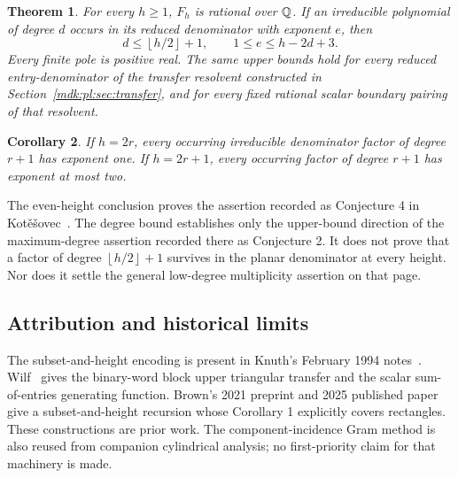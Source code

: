 \documentclass[11pt,letterpaper]{article}
\numberwithin{equation}{section}
\newtheorem{theorem}{Theorem}[section]
\newtheorem{corollary}[theorem]{Corollary}
\theoremstyle{remark}\newtheorem{remark}[theorem]{Remark}
\newcommand{\floor}[1]{\left\lfloor #1\right\rfloor}
\begin{document}
\begin{theorem}\label{mdk:pl:thm:main}
For every $h\ge1$, $F_h$ is rational over $\mathbb Q$. If an irreducible polynomial of degree $d$ occurs in its reduced denominator with exponent $e$, then
\begin{equation}\label{mdk:pl:eq:main}
 d\le\floor{h/2}+1,\qquad 1\le e\le h-2d+3.
\end{equation}
Every finite pole is positive real. The same upper bounds hold for every reduced entry-denominator of the transfer resolvent constructed in Section~\ref{mdk:pl:sec:transfer}, and for every fixed rational scalar boundary pairing of that resolvent.
\end{theorem}

\begin{corollary}\label{mdk:pl:cor:parity}
If $h=2r$, every occurring irreducible denominator factor of degree $r+1$ has exponent one. If $h=2r+1$, every occurring factor of degree $r+1$ has exponent at most two.
\end{corollary}

The even-height conclusion proves the assertion recorded as Conjecture 4 in Kot\v e\v sovec~\cite[p.~83]{kotesovec}. The degree bound establishes only the upper-bound direction of the maximum-degree assertion recorded there as Conjecture 2. It does not prove that a factor of degree $\floor{h/2}+1$ survives in the planar denominator at every height. Nor does it settle the general low-degree multiplicity assertion on that page.

\subsection{Attribution and historical limits}
The subset-and-height encoding is present in Knuth's February 1994 notes~\cite{knuth}. Wilf~\cite[Lemmas 2--3]{wilf} gives the binary-word block upper triangular transfer and the scalar sum-of-entries generating function. Brown's 2021 preprint and 2025 published paper~\cite{brown} give a subset-and-height recursion whose Corollary 1 explicitly covers rectangles. These constructions are prior work. The component-incidence Gram method is also reused from companion cylindrical analysis; no first-priority claim for that machinery is made.
\end{document}
